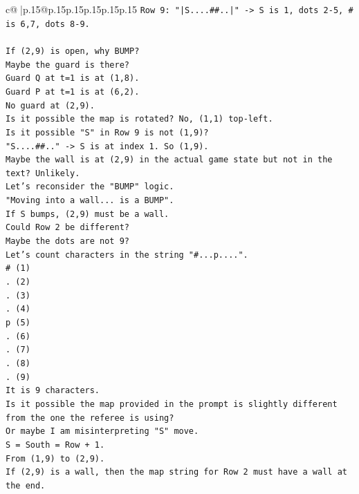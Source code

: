 \documentclass{article}
\begin{document}
{\begin{supertabular}{c@{$\;$}|p{.15\linewidth}@{}p{.15\linewidth}p{.15\linewidth}p{.15\linewidth}p{.15\linewidth}p{.15\linewidth}}
{{{\texttt{Row 9: "|S....\#\#..|" {-}> S is 1, dots 2{-}5, \# is 6,7, dots 8{-}9.} \\
\\ 
\texttt{If (2,9) is open, why BUMP?} \\
\texttt{Maybe the guard is there?} \\
\texttt{Guard Q at t=1 is at (1,8).} \\
\texttt{Guard P at t=1 is at (6,2).} \\
\texttt{No guard at (2,9).} \\
\texttt{Is it possible the map is rotated? No, (1,1) top{-}left.} \\
\texttt{Is it possible "S" in Row 9 is not (1,9)?} \\
\texttt{"S....\#\#.." {-}> S is at index 1. So (1,9).} \\
\texttt{Maybe the wall is at (2,9) in the actual game state but not in the text? Unlikely.} \\
\texttt{Let's reconsider the "BUMP" logic.} \\
\texttt{"Moving into a wall... is a BUMP".} \\
\texttt{If S bumps, (2,9) must be a wall.} \\
\texttt{Could Row 2 be different?} \\
\texttt{Maybe the dots are not 9?} \\
\texttt{Let's count characters in the string "\#...p....".} \\
\texttt{\# (1)} \\
\texttt{. (2)} \\
\texttt{. (3)} \\
\texttt{. (4)} \\
\texttt{p (5)} \\
\texttt{. (6)} \\
\texttt{. (7)} \\
\texttt{. (8)} \\
\texttt{. (9)} \\
\texttt{It is 9 characters.} \\
\texttt{Is it possible the map provided in the prompt is slightly different from the one the referee is using?} \\
\texttt{Or maybe I am misinterpreting "S" move.} \\
\texttt{S = South = Row + 1.} \\
\texttt{From (1,9) to (2,9).} \\
\texttt{If (2,9) is a wall, then the map string for Row 2 must have a wall at the end.} \\
}}}
\end{supertabular}}
\end{document}
